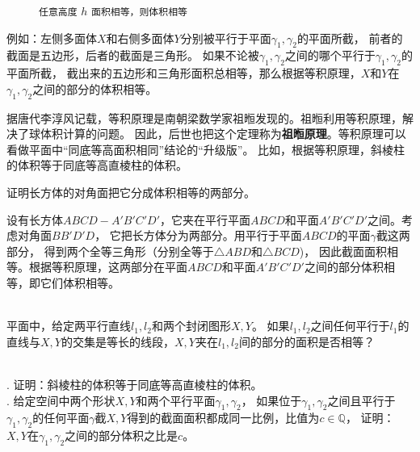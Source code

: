 \documentclass[12pt,UTF8,fontset=none]{ctexbook}
\begin{document}
\begin{figure}[h]
    \captionsetup{justification=centering}
    \caption*{\texttt{任意高度} $h$ \texttt{面积相等，则体积相等}}
\end{figure}


例如：左侧多面体$X$和右侧多面体$Y$分别被平行于平面$\gamma_1,\gamma_2$的平面所截，
前者的截面是五边形，后者的截面是三角形。
如果不论被$\gamma_1,\gamma_2$之间的哪个平行于$\gamma_1,\gamma_2$的平面所截，
截出来的五边形和三角形面积总相等，那么根据等积原理，$X$和$Y$在$\gamma_1,\gamma_2$之间的部分的体积相等。

据唐代李淳风记载，等积原理是南朝梁数学家祖暅发现的。祖暅利用等积原理，解决了球体积计算的问题。
因此，后世也把这个定理称为\textbf{祖暅原理}。等积原理可以看做平面中“同底等高面积相同”结论的“升级版”。
比如，根据等积原理，斜棱柱的体积等于同底等高直棱柱的体积。
\begin{et}
    证明长方体的对角面把它分成体积相等的两部分。
\end{et}
\begin{so}
    设有长方体$ABCD-A'B'C'D'$，它夹在平行平面$ABCD$和平面$A'B'C'D'$之间。考虑对角面$BB'D'D$，
    它把长方体分为两部分。用平行于平面$ABCD$的平面$\gamma$截这两部分，
    得到两个全等三角形（分别全等于$\triangle ABD$和$\triangle BCD$)，
    因此截面面积相等。根据等积原理，这两部分在平面$ABCD$和平面$A'B'C'D'$之间的部分体积相等，即它们体积相等。
\end{so}
\begin{sk}
    \mbox{}\\
    平面中，给定两平行直线$l_1,l_2$和两个封闭图形$X,Y$。
    如果$l_1,l_2$之间任何平行于$l_1$的直线与$X,Y$的交集是等长的线段，$X,Y$夹在$l_1,l_2$间的部分的面积是否相等？
\end{sk}
\begin{xt}
    \mbox{}\\
    . 证明：斜棱柱的体积等于同底等高直棱柱的体积。\\
    . 给定空间中两个形状$X,Y$和两个平行平面$\gamma_1,\gamma_2$，
    如果位于$\gamma_1,\gamma_2$之间且平行于$\gamma_1,\gamma_2$的任何平面$\gamma$截$X,Y$得到的截面面积都成同一比例，比值为$c\in\mathbb{Q}$，
    证明：$X,Y$在$\gamma_1,\gamma_2$之间的部分体积之比是$c$。
\end{xt}
\end{document}
